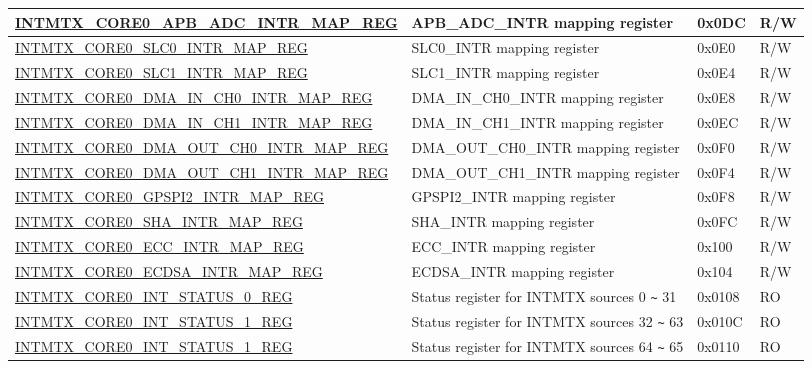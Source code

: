 \begin{longtable}{ | p{10cm} | p{10cm} | p{1.3cm} | p{1cm} | }
\hyperref[regdesc:INTMTXCORE0APBADCINTRMAPREG]{INTMTX\_CORE0\_APB\_ADC\_INTR\_MAP\_REG} & APB\_ADC\_INTR mapping register & 0x0DC & R/W  \\ \hline
\hyperref[regdesc:INTMTXCORE0SLC0INTRMAPREG]{INTMTX\_CORE0\_SLC0\_INTR\_MAP\_REG} & SLC0\_INTR mapping register & 0x0E0 & R/W  \\ \hline
\hyperref[regdesc:INTMTXCORE0SLC1INTRMAPREG]{INTMTX\_CORE0\_SLC1\_INTR\_MAP\_REG} & SLC1\_INTR mapping register & 0x0E4 & R/W  \\ \hline
\hyperref[regdesc:INTMTXCORE0DMAINCH0INTRMAPREG]{INTMTX\_CORE0\_DMA\_IN\_CH0\_INTR\_MAP\_REG} & DMA\_IN\_CH0\_INTR mapping register & 0x0E8 & R/W  \\ \hline
\hyperref[regdesc:INTMTXCORE0DMAINCH1INTRMAPREG]{INTMTX\_CORE0\_DMA\_IN\_CH1\_INTR\_MAP\_REG} & DMA\_IN\_CH1\_INTR mapping register & 0x0EC & R/W  \\ \hline
\hyperref[regdesc:INTMTXCORE0DMAOUTCH0INTRMAPREG]{INTMTX\_CORE0\_DMA\_OUT\_CH0\_INTR\_MAP\_REG} & DMA\_OUT\_CH0\_INTR mapping register & 0x0F0 & R/W  \\ \hline
\hyperref[regdesc:INTMTXCORE0DMAOUTCH1INTRMAPREG]{INTMTX\_CORE0\_DMA\_OUT\_CH1\_INTR\_MAP\_REG} & DMA\_OUT\_CH1\_INTR mapping register & 0x0F4 & R/W  \\ \hline
\hyperref[regdesc:INTMTXCORE0GPSPI2INTRMAPREG]{INTMTX\_CORE0\_GPSPI2\_INTR\_MAP\_REG} & GPSPI2\_INTR mapping register & 0x0F8 & R/W  \\ \hline
\hyperref[regdesc:INTMTXCORE0SHAINTRMAPREG]{INTMTX\_CORE0\_SHA\_INTR\_MAP\_REG} & SHA\_INTR mapping register & 0x0FC & R/W  \\ \hline
\hyperref[regdesc:INTMTXCORE0ECCINTRMAPREG]{INTMTX\_CORE0\_ECC\_INTR\_MAP\_REG} & ECC\_INTR mapping register & 0x100 & R/W  \\ \hline
\hyperref[regdesc:INTMTXCORE0ECDSAINTRMAPREG]{INTMTX\_CORE0\_ECDSA\_INTR\_MAP\_REG} & ECDSA\_INTR mapping register & 0x104 & R/W  \\ \hline

\hyperref[regdesc:INTMTXCORE0INTSTATUS0REG]{INTMTX\_CORE0\_INT\_STATUS\_0\_REG} & Status register for INTMTX sources 0 \verb+~+ 31 & 0x0108 & RO \\ \hline
\hyperref[regdesc:INTMTXCORE0INTSTATUS1REG]{INTMTX\_CORE0\_INT\_STATUS\_1\_REG} & Status register for INTMTX sources 32 \verb+~+ 63 & 0x010C & RO \\ \hline
\hyperref[regdesc:INTMTXCORE0INTSTATUS1REG]{INTMTX\_CORE0\_INT\_STATUS\_1\_REG} & Status register for INTMTX sources 64 \verb+~+ 65 & 0x0110 & RO \\ \hline


\end{longtable}
